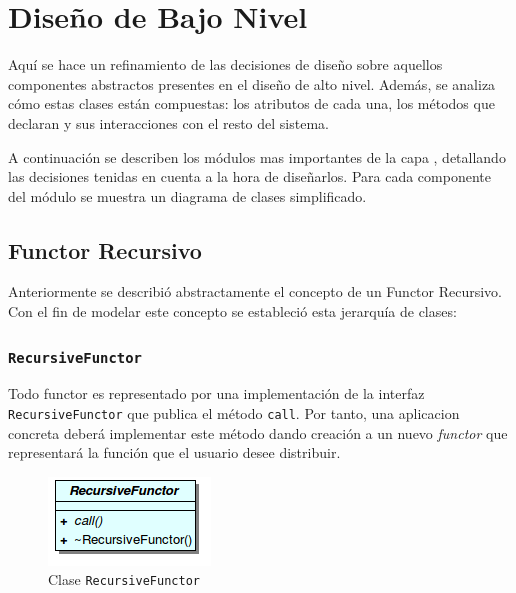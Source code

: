 \section{Diseño de Bajo Nivel}

Aquí se hace un refinamiento de las decisiones de diseño sobre aquellos componentes abstractos presentes en el
diseño de alto nivel. Además, se analiza cómo estas clases están compuestas: los atributos de cada una, los métodos que
declaran y sus interacciones con el resto del sistema. 

A continuación se describen los módulos mas importantes de la capa \rc{}, detallando las decisiones tenidas en
cuenta a la hora de diseñarlos. Para cada componente del módulo se muestra un diagrama de clases
simplificado.

\subsection{Functor Recursivo}

Anteriormente se describió abstractamente el concepto de un Functor Recursivo. Con el fin
de modelar este concepto se estableció esta jerarquía de clases:
    
    \subsubsection{\texttt{RecursiveFunctor}}
        Todo functor es representado por una implementación de la interfaz \\ \texttt{RecursiveFunctor} que publica el
        método \texttt{call}. Por tanto, una aplicacion concreta deberá implementar este método dando creación a un
        nuevo \textit{functor} que representará la función que el usuario desee distribuir.

        \begin{figure}[ht] \hspace{4.5cm}
            \includegraphics[scale=.75]{images/rf.png}
            \caption{Clase \texttt{RecursiveFunctor}}
        \end{figure}
        
